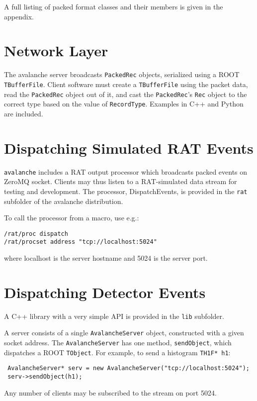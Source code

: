 \documentclass{article}
\begin{document}
A full listing of packed format classes and their members is given in the appendix.

\section{Network Layer}
The avalanche server broadcasts {\tt PackedRec} objects, serialized using a ROOT {\tt TBufferFile}. Client software must create a {\tt TBufferFile} using the packet data, read the {\tt PackedRec} object out of it, and cast the {\tt PackedRec}'s {\tt Rec} object to the correct type based on the value of {\tt RecordType}. Examples in C++ and Python are included.

\section{Dispatching Simulated RAT Events}
{\tt avalanche} includes a RAT output processor which broadcasts packed events on ZeroMQ socket. Clients may thus listen to a RAT-simulated data stream for testing and development. The processor, DispatchEvents, is provided in the {\tt rat} subfolder of the avalanche distribution.

To call the processor from a macro, use e.g.:
\begin{verbatim}
/rat/proc dispatch
/rat/procset address "tcp://localhost:5024"
\end{verbatim}
where localhost is the server hostname and 5024 is the server port.

\section{Dispatching Detector Events}
A C++ library with a very simple API is provided in the {\tt lib} subfolder.

A server consists of a single {\tt AvalancheServer} object, constructed with a given socket address. The {\tt AvalancheServer} has one method, {\tt sendObject}, which dispatches a ROOT {\tt TObject}. For example, to send a histogram {\tt TH1F* h1}:

\begin{verbatim}
 AvalancheServer* serv = new AvalancheServer("tcp://localhost:5024");
 serv->sendObject(h1);
\end{verbatim}

Any number of clients may be subscribed to the stream on port 5024.

\end{document}
